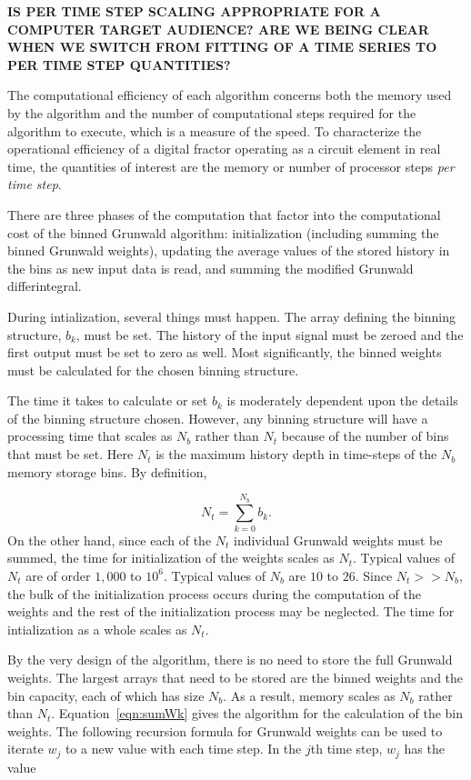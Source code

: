 {\bf IS PER TIME STEP SCALING APPROPRIATE FOR A COMPUTER TARGET
AUDIENCE? ARE WE BEING CLEAR WHEN WE SWITCH FROM FITTING OF A TIME
SERIES TO PER TIME STEP QUANTITIES?}

The computational efficiency of each algorithm concerns both the
memory used by the algorithm and the number of computational steps
required for the algorithm to execute, which is a measure of the
speed. To characterize the operational efficiency of a digital fractor
operating as a circuit element in real time, the quantities of
interest are the memory or number of processor steps {\em per time
  step}.

There are three phases of the computation that factor into the
computational cost of the binned Grunwald algorithm: initialization
(including summing the binned Grunwald weights), updating the average
values of the stored history in the bins as new input data is read,
and summing the modified Grunwald differintegral.

During intialization, several things must happen. The array defining
the binning structure, $b_k$, must be set. The history of the input
signal must be zeroed and the first output must be set to zero as
well. Most significantly, the binned weights must be calculated for
the chosen binning structure.

The time it takes to calculate or set $b_k$ is moderately dependent
upon the details of the binning structure chosen. However, any binning
structure will have a processing time that scales as $N_b$ rather than
$N_t$ because of the number of bins that must be set. Here $N_t$ is
the maximum history depth in time-steps of the $N_b$ memory storage
bins. By definition,

\begin{equation}
N_t = \displaystyle\sum_{k=0}^{N_b}b_k.
\label{eqn:Nt}
\end{equation}
On the other hand, since each of the $N_t$ individual Grunwald weights
must be summed, the time for initialization of the weights scales as
$N_t$. Typical values of $N_t$ are of order $1,000$ to $10^6$. Typical
values of $N_b$ are $10$ to $26$. Since $N_t>>N_b$, the bulk of the
initialization process occurs during the computation of the weights
and the rest of the initialization process may be neglected. The time
for intialization as a whole scales as $N_t$.

By the very design of the algorithm, there is no need to store the
full Grunwald weights. The largest arrays that need to be stored are
the binned weights and the bin capacity, each of which has size
$N_b$. As a result, memory scales as $N_b$ rather than
$N_t$. Equation~\ref{eqn:sumWk} gives the algorithm for the calculation
of the bin weights. The following recursion formula for Grunwald
weights can be used to iterate $w_j$ to a new value with each time
step. In the $j$th time step, $w_j$ has the value


